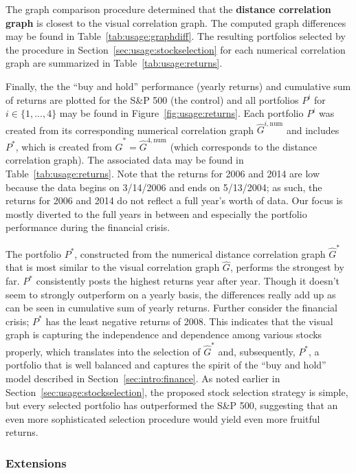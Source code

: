 The graph comparison procedure determined that the \textbf{distance correlation 
graph} is closest to the visual correlation graph. 
The computed graph differences may be found in Table~\ref{tab:usage:graphdiff}.
The resulting portfolios selected by the procedure in 
Section~\ref{sec:usage:stockselection} for each numerical correlation graph are 
summarized in Table~\ref{tab:usage:returns}.

Finally, the the ``buy and hold'' performance (yearly returns) and cumulative 
sum of returns are plotted for the S\&P 500 (the control) and
all portfolios $P^i$ for $i \in \{1,...,4\}$ may be found in 
Figure~\ref{fig:usage:returns}. Each portfolio $P^i$ was created 
from its corresponding numerical correlation graph $\hat{G}^{i,\text{num}}$ and 
includes $P^*$, which is created from $\hat{G}^* = \hat{G}^{4,\text{num}}$ 
(which corresponds to the distance correlation graph). The associated 
data may be found in Table~\ref{tab:usage:returns}. Note 
that the returns for 2006 and 2014 are low because the data begins 
on 3/14/2006 and ends on 5/13/2004; as such, the returns for 2006 and 2014 do 
not reflect a full year's worth of data. Our focus is mostly diverted to the 
full years in between and especially the portfolio performance during the 
financial crisis. 

The portfolio $P^*$, constructed from the numerical distance correlation graph 
$\hat{G}^*$ that is most similar to the visual correlation graph $\hat{G}$, 
performs the strongest by far. $P^*$ consistently posts the highest returns 
year after year. Though it doesn't seem to strongly outperform on a yearly 
basis, the differences really add up as can be seen in cumulative sum of yearly 
returns. Further 
consider the financial crisis; $P^*$ has the least negative returns of 2008. 
This indicates that the visual graph is capturing the independence and 
dependence among various stocks properly, which translates into the selection 
of $\hat{G}^*$ and, subsequently, $P^*$, a portfolio that is well balanced and 
captures the spirit of the ``buy and hold'' model described in 
Section~\ref{sec:intro:finance}.
As noted earlier in Section~\ref{sec:usage:stockselection}, the proposed stock 
selection strategy is simple, but every selected portfolio has outperformed the 
S\&P 500, suggesting that an even more sophisticated selection procedure would 
yield even more fruitful returns.

\subsubsection{Extensions}

